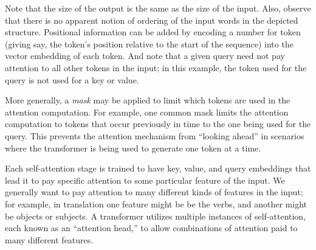
Note that the size of the output is the same as the size of the input.  Also, observe that there is no apparent notion of ordering of the input words in the depicted structure.  Positional information can be added by encoding a number for token (giving say, the token's position relative to the start of the sequence) into the vector embedding of each token.  And note that a given query need not pay attention to all other tokens in the input; in this example, the token used for the query is not used for a key or value.

More generally, a {\em mask} may be applied to limit which tokens are used in the attention computation.  For example, one common mask limits the attention computation to tokens that occur previously in time to the one being used for the query.  This prevents the attention mechanism from ``looking ahead'' in scenarios where the transformer is being used to generate one token at a time.


Each self-attention stage is trained to have key, value, and query embeddings that lead it to pay specific attention to some particular feature of the input.  We generally want to pay attention to many different kinds of features in the input; for example, in translation one feature might be be the verbs, and another might be objects or subjects.  A transformer utilizes multiple instances of self-attention, each known as an ``attention head,'' to allow combinations of attention paid to many different features.

